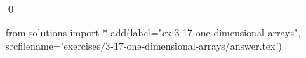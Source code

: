 
\begin{ex}
  \label{ex:3-17-one-dimensional-arrays}
  
  \qed
\end{ex}
\begin{python0}
from solutions import *
add(label="ex:3-17-one-dimensional-arrays",
    srcfilename='exercises/3-17-one-dimensional-arrays/answer.tex')
\end{python0}
